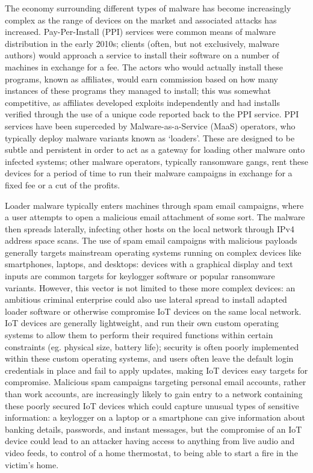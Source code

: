 \documentclass[10pt,sigconf]{acmart}
\begin{document}
The economy surrounding different types of malware has become increasingly complex as the range of devices on the market and associated attacks has increased.
Pay-Per-Install (PPI) services were common means of malware distribution in the early 2010s;
clients (often, but not exclusively, malware authors) would approach a service to install their software on a number of machines in exchange for a fee.
The actors who would actually install these programs, known as affiliates, would earn commission based on how many instances of these programs they managed to install;
this was somewhat competitive, as affiliates developed exploits independently and had installs verified through the use of a unique code reported back to the PPI service.
PPI services have been superceded by Malware-as-a-Service (MaaS) operators, who typically deploy malware variants known as `loaders'.
These are designed to be subtle and persistent in order to act as a gateway for loading other malware onto infected systems;
other malware operators, typically ransomware gangs, rent these devices for a period of time to run their malware campaigns in exchange for a fixed fee or a cut of the profits.

Loader malware typically enters machines through spam email campaigns, where a user attempts to open a malicious email attachment of some sort.
The malware then spreads laterally, infecting other hosts on the local network through IPv4 address space scans.
The use of spam email campaigns with malicious payloads generally targets mainstream operating systems running on complex devices like smartphones, laptops, and desktops: devices with a graphical display and text inputs are common targets for keylogger software or popular ransomware variants.
However, this vector is not limited to these more complex devices: an ambitious criminal enterprise could also use lateral spread to install adapted loader software or otherwise compromise IoT devices on the same local network.
IoT devices are generally lightweight, and run their own custom operating systems to allow them to perform their required functions within certain constraints (eg. physical size, battery life);
security is often poorly implemented within these custom operating systems, and users often leave the default login credentials in place and fail to apply updates, making IoT devices easy targets for compromise.
Malicious spam campaigns targeting personal email accounts, rather than work accounts, are increasingly likely to gain entry to a network containing these poorly secured IoT devices which could capture unusual types of sensitive information:
a keylogger on a laptop or a smartphone can give information about banking details, passwords, and instant messages, but the compromise of an IoT device could lead to an attacker having access to anything from live audio and video feeds, to control of a home thermostat, to being able to start a fire in the victim's home.
\end{document}
